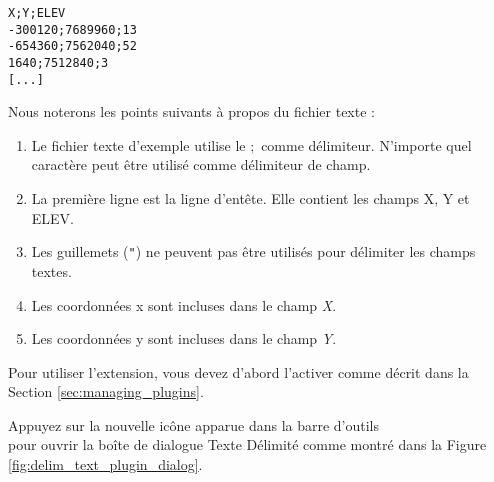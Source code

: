 \begin{verbatim} 
X;Y;ELEV
-300120;7689960;13
-654360;7562040;52
1640;7512840;3
[...]
\end{verbatim}

Nous noterons les points suivants à propos du fichier texte :

\begin{enumerate}
\item Le fichier texte d'exemple utilise le \mbox{$;$} comme délimiteur. 
N'importe quel caractère peut être utilisé comme délimiteur de champ.
\item La première ligne est la ligne d'entête. Elle contient les champs X, Y 
et ELEV.
\item Les guillemets ({\tt{}"{}}) ne peuvent pas être utilisés pour délimiter 
les champs textes.
\item Les coordonnées x sont incluses dans le champ {\em X}.
\item Les coordonnées y sont incluses dans le champ {\em Y}.
\end{enumerate}

Pour utiliser l'extension, vous devez d'abord l'activer comme décrit dans la 
Section \ref{sec:managing_plugins}.

Appuyez sur la nouvelle icône apparue dans la barre d'outils\\  
pour ouvrir la boîte de dialogue Texte Délimité comme montré dans la Figure \ref{fig:delim_text_plugin_dialog}.

